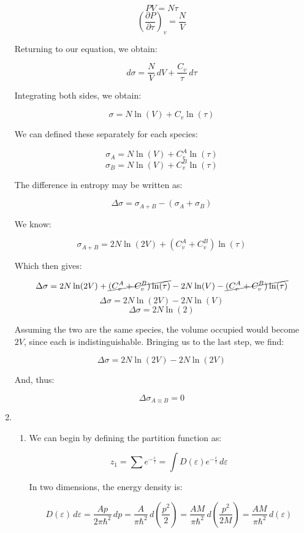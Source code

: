 \begin{enumerate}
    $$PV=N\tau$$
    $$\left( \frac{\partial P}{\partial \tau} \right)_v=\frac{N}{V}$$

    Returning to our equation, we obtain:

    $$d\sigma=\frac{N}{V}\,dV+\frac{C_v}{\tau}\,d\tau$$

    Integrating both sides, we obtain:

    $$\sigma=N\ln(V)+C_v\ln(\tau)$$

    We can defined these separately for each species:

    $$\sigma_A=N\ln(V)+C^A_v\ln(\tau)$$
    $$\sigma_B=N\ln(V)+C^B_v\ln(\tau)$$

    The difference in entropy may be written as:

    $$\Delta\sigma=\sigma_{A+B}-(\sigma_A+\sigma_B)$$

    We know:

    $$\sigma_{A+B}=2N\ln(2V)+(C^A_v+C^B_v)\ln(\tau)$$

    Which then gives:

    $$\Delta\sigma=2N\ln(2V)+\cancel{(C^A_v+C^B_v)\ln(\tau)}-2N\ln(V)-\cancel{(C^A_v+C^B_v)\ln(\tau)}$$
    $$\Delta\sigma=2N\ln(2V)-2N\ln(V)$$
    $$\boxed{\Delta\sigma=2N\ln(2)}$$

    Assuming the two are the same species, the volume occupied would become $2V$, since each is indistinguishable. Bringing us to the last step, we find:

    $$\Delta\sigma=2N\ln(2V)-2N\ln(2V)$$

    And, thus:

    $$\boxed{\Delta\sigma_{A\equiv B}=0}$$

    \setcounter{enumi}{11}

  \item

    \begin{enumerate}

      \item 

        We can begin by defining the partition function as:

        $$z_1=\sum e^{-\frac{\varepsilon}{\tau}}=\int D(\varepsilon)e^{-\frac{\varepsilon}{\tau}}\,d\varepsilon$$

        In two dimensions, the energy density is:

        $$D(\varepsilon)\,d\varepsilon=\frac{Ap}{2\pi\hbar^2}\,dp=\frac{A}{\pi\hbar^2}\,d\left( \frac{p^2}{2} \right)=\frac{AM}{\pi\hbar^2}\,d\left( \frac{p^2}{2M} \right)=\frac{AM}{\pi\hbar^2}\,d\left( \varepsilon\right)$$


\end{enumerate}
\end{enumerate}
